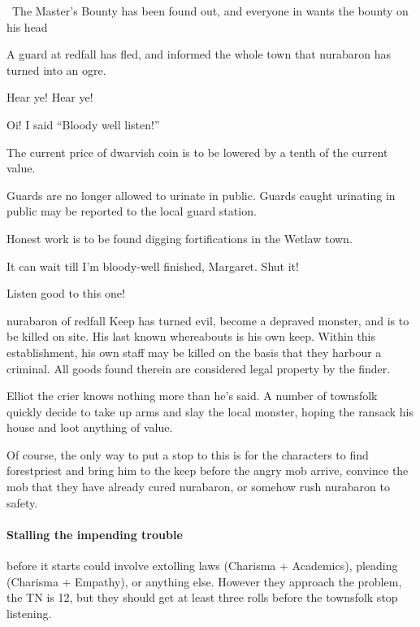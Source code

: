 \begin{multicols}{2}

{\N \N\ The Master's Bounty}%
{ has been found out, and everyone in  wants the bounty on his head}%
\label{mastersBounty}

A guard at \gls{redfall} has fled, and informed the whole town that \gls{nurabaron} has turned into an ogre.

\begin{speechtext}

    Hear ye! Hear ye!

    Oi! I said ``Bloody well listen!''

    The current price of dwarvish coin is to be lowered by a tenth of the current value.

    Guards are no longer allowed to urinate in public.
    Guards caught urinating in public may be reported to the local guard station.

    Honest work is to be found digging fortifications in the Wetlaw town.

    It can wait till I'm bloody-well finished, Margaret.  Shut it!

    Listen good to this one!

    \gls{nurabaron} of \gls{redfall} Keep has turned evil, become a depraved monster, and is to be killed on site.  His last known whereabouts is his own keep.  Within this establishment, his own staff may be killed on the basis that they harbour a criminal.  All goods found therein are considered legal property by the finder.

\end{speechtext}

Elliot the crier knows nothing more than he's said.  A number of townsfolk quickly decide to take up arms and slay the local monster, hoping the ransack his house and loot anything of value.

Of course, the only way to put a stop to this is for the characters to find \gls{forestpriest} and bring him to the keep before the angry mob arrive, convince the mob that they have already cured \gls{nurabaron}, or somehow rush \gls{nurabaron} to safety.

\paragraph{Stalling the impending trouble}
before it starts could involve extolling laws (Charisma + Academics), pleading (Charisma + Empathy), or anything else.
However they approach the problem, the TN is 12, but they should get at least three rolls before the townsfolk stop listening.


\end{multicols}
